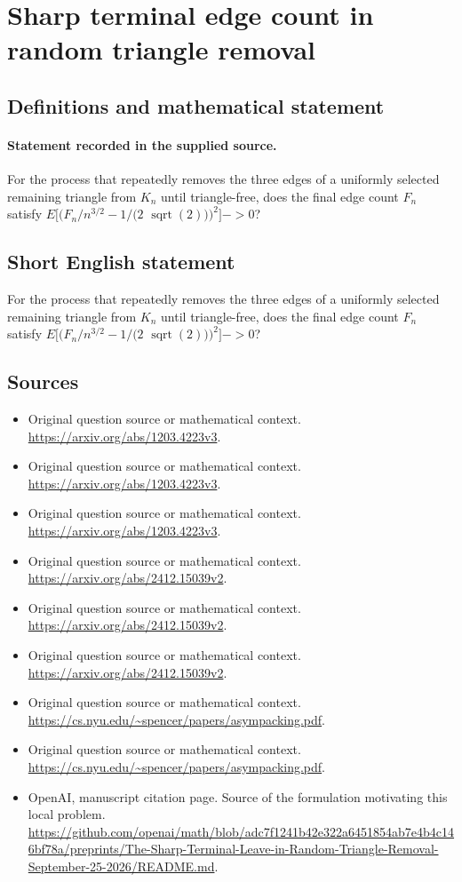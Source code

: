 \documentclass[11pt]{article}
\begin{document}
\section*{Sharp terminal edge count in random triangle removal}\label{statement}
\subsection{Definitions and mathematical statement}
\paragraph{Statement recorded in the supplied source.}
For the process that repeatedly removes the three edges of a uniformly selected remaining triangle from $K_n$ until triangle-free, does the final edge count $F_n$ satisfy $E[(F_n/n^{3/2}-1/(2$ $\operatorname{sqrt}(2)))^2]->0$?
\subsection{Short English statement}
For the process that repeatedly removes the three edges of a uniformly selected remaining triangle from $K_n$ until triangle-free, does the final edge count $F_n$ satisfy $E[(F_n/n^{3/2}-1/(2$ $\operatorname{sqrt}(2)))^2]->0$?
\subsection{Sources}
\begin{itemize}
\item[S1] Original question source or mathematical context.
\url{https://arxiv.org/abs/1203.4223v3}.
\item[S2] Original question source or mathematical context.
\url{https://arxiv.org/abs/1203.4223v3}.
\item[S3] Original question source or mathematical context.
\url{https://arxiv.org/abs/1203.4223v3}.
\item[S4] Original question source or mathematical context.
\url{https://arxiv.org/abs/2412.15039v2}.
\item[S5] Original question source or mathematical context.
\url{https://arxiv.org/abs/2412.15039v2}.
\item[S6] Original question source or mathematical context.
\url{https://arxiv.org/abs/2412.15039v2}.
\item[S7] Original question source or mathematical context.
\url{https://cs.nyu.edu/~spencer/papers/asympacking.pdf}.
\item[S8] Original question source or mathematical context.
\url{https://cs.nyu.edu/~spencer/papers/asympacking.pdf}.
\item[S9] OpenAI, manuscript citation page. Source of the formulation motivating this local problem.
\url{https://github.com/openai/math/blob/adc7f1241b42e322a6451854ab7e4b4c146bf78a/preprints/The-Sharp-Terminal-Leave-in-Random-Triangle-Removal-September-25-2026/README.md}.
\end{itemize}
\end{document}
